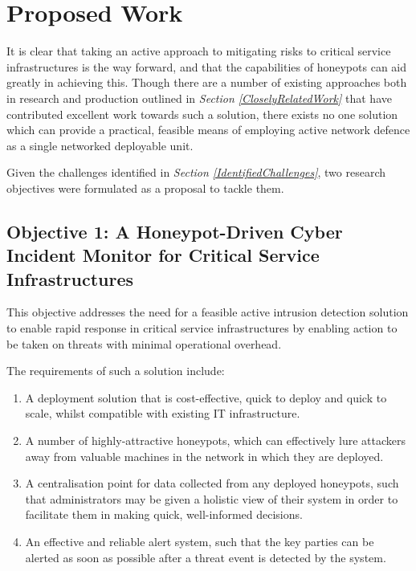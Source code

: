 %
%
%
%

\section{Proposed Work} \label{ProposedWork}

It is clear that taking an active approach to mitigating risks to critical service infrastructures is the way forward, and that the capabilities of honeypots can aid greatly in achieving this. Though there are a number of existing approaches both in research and production outlined in \textit{Section \ref{CloselyRelatedWork}} that have contributed excellent work towards such a solution, there exists no one solution which can provide a practical, feasible means of employing active network defence as a single networked deployable unit.

Given the challenges identified in \textit{Section \ref{IdentifiedChallenges}}, two research objectives were formulated as a proposal to tackle them.

\subsection{Objective 1: A Honeypot-Driven Cyber Incident Monitor for Critical Service Infrastructures} \label{Objective1}

This objective addresses the need for a feasible active intrusion detection solution to enable rapid response in critical service infrastructures by enabling action to be taken on threats with minimal operational overhead. 

The requirements of such a solution include:

\begin{enumerate}
\item A deployment solution that is cost-effective, quick to deploy and quick to scale, whilst compatible with existing IT infrastructure. 
\item A number of highly-attractive honeypots, which can effectively lure attackers away from valuable machines in the network in which they are deployed. 
\item A centralisation point for data collected from any deployed honeypots, such that administrators may be given a holistic view of their system in order to facilitate them in making quick, well-informed decisions.
\item An effective and reliable alert system, such that the key parties can be alerted as soon as possible after a threat event is detected by the system.
\end{enumerate}

